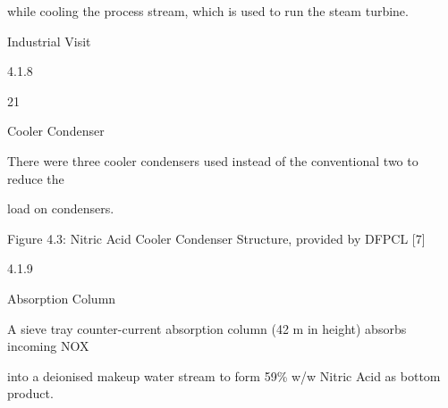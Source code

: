 \documentclass[a4paper,portrait,12pt]{article}
\begin{document}
\begin{flushleft}
while cooling the process stream, which is used to run the steam turbine.
\end{flushleft}





\begin{flushleft}
\newpage
Industrial Visit
\end{flushleft}





4.1.8





21





\begin{flushleft}
Cooler Condenser
\end{flushleft}





\begin{flushleft}
There were three cooler condensers used instead of the conventional two to reduce the
\end{flushleft}


\begin{flushleft}
load on condensers.
\end{flushleft}





\begin{flushleft}
Figure 4.3: Nitric Acid Cooler Condenser Structure, provided by DFPCL [7]
\end{flushleft}





4.1.9





\begin{flushleft}
Absorption Column
\end{flushleft}





\begin{flushleft}
A sieve tray counter-current absorption column (42 m in height) absorbs incoming NOX
\end{flushleft}


\begin{flushleft}
into a deionised makeup water stream to form 59\% w/w Nitric Acid as bottom product.
\end{flushleft}
\end{document}
